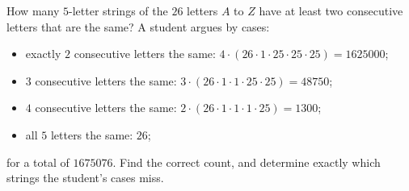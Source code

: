 How many $5$-letter strings of the $26$ letters $A$ to $Z$ have at least two consecutive letters that are the same? A student argues by cases:
\begin{itemize}
\item exactly $2$ consecutive letters the same: $4\cdot(26\cdot1\cdot25\cdot25\cdot25)=1625000$;
\item $3$ consecutive letters the same: $3\cdot(26\cdot1\cdot1\cdot25\cdot25)=48750$;
\item $4$ consecutive letters the same: $2\cdot(26\cdot1\cdot1\cdot1\cdot25)=1300$;
\item all $5$ letters the same: $26$;
\end{itemize}
for a total of $1675076$. Find the correct count, and determine exactly which strings the student's cases miss.

